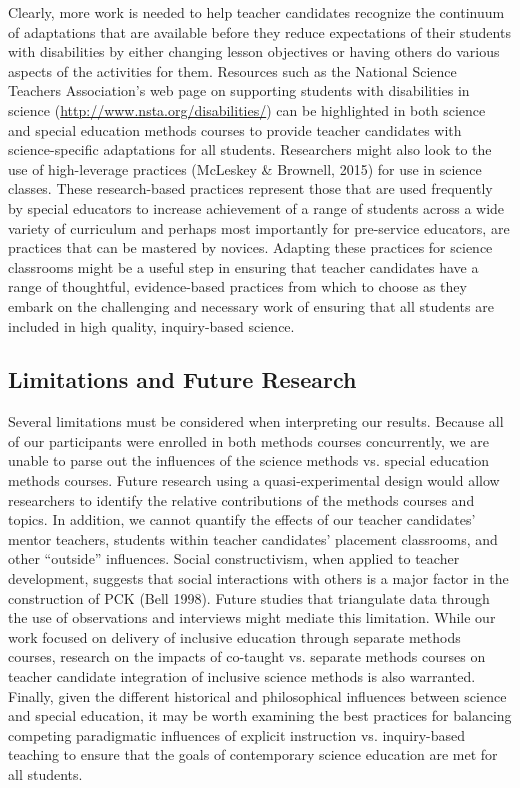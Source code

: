 \documentclass[11.5pt]{sig-alternate} %
\begin{document}
\begin{large}
Clearly, more work is needed to help teacher candidates recognize the continuum of adaptations that are available before they reduce expectations of their students with disabilities by either changing lesson objectives or having others do various aspects of the activities for them.  Resources such as the National Science Teachers Association’s web page on supporting students with disabilities in science (\url{http://www.nsta.org/disabilities/}) can be highlighted in both science and special education methods courses to provide teacher candidates with science-specific adaptations for all students. Researchers might also look to the use of high-leverage practices (McLeskey \& Brownell, 2015) for use in science classes.  These research-based practices represent those that are used frequently by special educators to increase achievement of a range of students across a wide variety of curriculum and perhaps most importantly for pre-service educators, are practices that can be mastered by novices.  Adapting these practices for science classrooms might be a useful step in ensuring that teacher candidates have a range of thoughtful, evidence-based practices from which to choose as they embark on the challenging and necessary work of ensuring that all students are included in high quality, inquiry-based science. 

\subsection*{Limitations and Future Research}

Several limitations must be considered when interpreting our results.  Because all of our participants were enrolled in both methods courses concurrently, we are unable to parse out the influences of the science methods vs. special education methods courses.  Future research using a quasi-experimental design would allow researchers to identify the relative contributions of the methods courses and topics.  In addition, we cannot quantify the effects of our teacher candidates’ mentor teachers, students within teacher candidates’ placement classrooms, and other “outside” influences. Social constructivism, when applied to teacher development, suggests that social interactions with others is a major factor in the construction of PCK (Bell 1998).  Future studies that triangulate data through the use of observations and interviews might mediate this limitation.  While our work focused on delivery of inclusive education through separate methods courses, research on the impacts of co-taught vs. separate methods courses on teacher candidate integration of inclusive science methods is also warranted.  Finally, given the different historical and philosophical influences between science and special education, it may be worth examining the best practices for balancing competing paradigmatic influences of explicit instruction vs. inquiry-based teaching to ensure that the goals of contemporary science education are met for all students. 

\end{large}
\clearpage{} 
\end{document}
